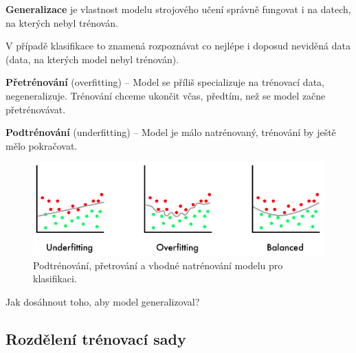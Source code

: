 \begin{compactitem}
    \item \textbf{Generalizace} je vlastnost modelu strojového učení správně fungovat i na datech, na kterých nebyl trénován.

    \begin{compactitem}
        \item V případě klasifikace to znamená rozpoznávat co nejlépe i doposud neviděná data (data, na kterých model nebyl trénován).
    \end{compactitem}

    \item \textbf{Přetrénování} (overfitting) -- Model se příliš specializuje na trénovací data, negeneralizuje. Trénování chceme ukončit včas, předtím, než se model začne přetrénovávat.

    \item \textbf{Podtrénování} (underfitting) -- Model je málo natrénovaný, trénování by ještě mělo pokračovat.

    \begin{figure}[H]
        \centering
        \includegraphics[width=1\linewidth]{fitting.png}
        \caption{Podtrénování, přetrování a vhodné natrénování modelu pro klasifikaci.}
    \end{figure}

    \item Jak dosáhnout toho, aby model generalizoval?
\end{compactitem}

\subsection{Rozdělení trénovací sady}

